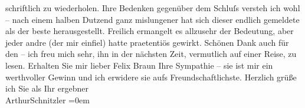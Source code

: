\begin{ledgroupsized}[t]{13cm}
                    schriftlich zu wiederholen. Ihre Bedenken gegenüber dem Schluſs versteh ich wohl
                    – nach einem halben Dutzend ganz mislungener hat sich dieser endlich gemeldete
                    als der beste herausgestellt. Freilich ermangelt es allzusehr der Bedeutung,
                    aber jeder andre (der mir einfiel) hatte praetentiös gewirkt.\pend
           \pstart
           Schönen Dank auch für den \label{K_L02487_1v}\label{K_L02487_1h} – ich freu mich sehr, ihn in der nächsten Zeit, vermutlich
                    auf einer Reise, zu lesen. Erhalten Sie mir lieber Felix Braun Ihre Sympathie –
                        {\pb}sie ist mir ein werthvoller
                    Gewinn und ich erwidere sie aufs Freundschaftlichste.\pend
           \pstart
           Herzlich grüße ich Sie als Ihr ergebner{\\[\baselineskip]}\spacefill\mbox{ArthurSchnitzler}\pend
           \leftskip=0em{}
         
         \endnumbering{}\end{ledgroupsized}  \newcommand{\dateiname}{L02487}\newcommand{\titel}{Arthur Schnitzler an Felix Braun, 28. 5. 1927}\newcommand{\editorInnen}{Martin Anton Müller und Gerd-Hermann Susen}
      